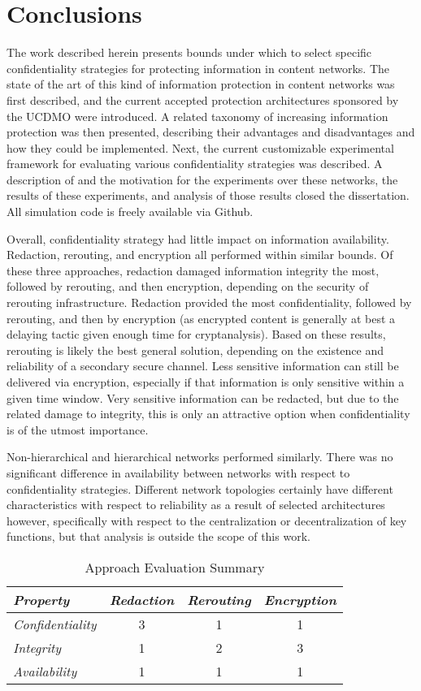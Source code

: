 \section{Conclusions}
The work described herein presents bounds under which to select specific confidentiality strategies for protecting information in content networks.  The state of the art of this kind of information protection in content networks was first described, and the current accepted protection architectures sponsored by the UCDMO were introduced.  A related taxonomy of increasing information protection was then presented, describing their advantages and disadvantages and how they could be implemented.  Next, the current customizable experimental framework for evaluating various confidentiality strategies was described.  A description of and the motivation for the experiments over these networks, the results of these experiments, and analysis of those results closed the dissertation.  All simulation code is freely available via Github.

Overall, confidentiality strategy had little impact on information availability.  Redaction, rerouting, and encryption all performed within similar bounds.  Of these three approaches, redaction damaged information integrity the most, followed by rerouting, and then encryption, depending on the security of rerouting infrastructure.  Redaction provided the most confidentiality, followed by rerouting, and then by encryption (as encrypted content is generally at best a delaying tactic given enough time for cryptanalysis).  Based on these results, rerouting is likely the best general solution, depending on the existence and reliability of a secondary secure channel.  Less sensitive information can still be delivered via encryption, especially if that information is only sensitive within a given time window.  Very sensitive information can be redacted, but due to the related damage to integrity, this is only an attractive option when confidentiality is of the utmost importance.
	
Non-hierarchical and hierarchical networks performed similarly.  There was no significant difference in availability between networks with respect to confidentiality strategies.  Different network topologies certainly have different characteristics with respect to reliability as a result of selected architectures however, specifically with respect to the centralization or decentralization of key functions, but that analysis is outside the scope of this work.
	
\begin{table*}[tp] %
\centering %
\begin{tabular}{lccc}
\toprule %
{\it Property}			& {\it Redaction}	& {\it Rerouting} 	& {\it Encryption} 	\\\toprule
{\it Confidentiality} 	& 3				  	& 1					& 1				 	\\\midrule
{\it Integrity}			& 1					& 2					& 3 					\\\midrule
{\it Availability}		& 1					& 1					& 1					\\\bottomrule
\end{tabular}
\caption{Approach Evaluation Summary}
\label{table:model:evaluation}
\end{table*}

